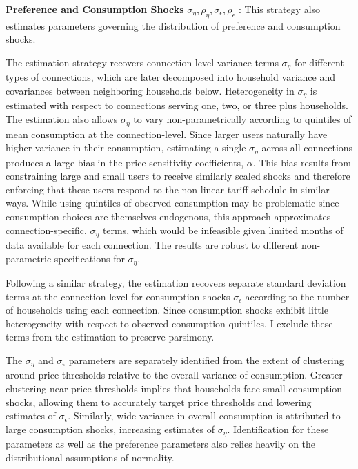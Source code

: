 \documentclass[12pt]{article}
\begin{document}
\textbf{Preference and Consumption Shocks} $\sigma_{\eta},\rho_{\eta},\sigma_{\epsilon},\rho_{\epsilon}$  :  This strategy also estimates parameters governing the distribution of preference and consumption shocks.  

The estimation strategy recovers connection-level variance terms $\sigma_{\eta}$ for different types of connections, which are later decomposed into household variance and covariances between neighboring households below.  Heterogeneity in $\sigma_{\eta}$ is estimated with respect to connections serving one, two, or three plus households.  The estimation also allows $\sigma_{\eta}$ to vary non-parametrically according to quintiles of mean consumption at the connection-level.  Since larger users naturally have higher variance in their consumption, estimating a single $\sigma_{\eta}$ across all connections produces a large bias in the price sensitivity coefficients, $\alpha$.  This bias results from constraining large and small users to receive similarly scaled shocks and therefore enforcing that these users respond to the non-linear tariff schedule in similar ways.  While using quintiles of observed consumption may be problematic since consumption choices are themselves endogenous, this approach approximates connection-specific, $\sigma_{\eta}$ terms, which would be infeasible given limited months of data available for each connection.  The results are robust to different non-parametric specifications for $\sigma_{\eta}$.  

Following a similar strategy, the estimation recovers separate standard deviation terms at the connection-level for consumption shocks $\sigma_{\epsilon}$ according to the number of households using each connection.  Since consumption shocks exhibit little heterogeneity with respect to observed consumption quintiles, I exclude these terms from the estimation to preserve parsimony.

The $\sigma_{\eta}$ and $\sigma_{\epsilon}$ parameters are separately identified from the extent of clustering around price thresholds relative to the overall variance of consumption.  Greater clustering near price thresholds implies that households face small consumption shocks, allowing them to accurately target price thresholds and lowering estimates of $\sigma_{\epsilon}$.  Similarly, wide variance in overall consumption is attributed to large consumption shocks, increasing estimates of $\sigma_{\eta}$.  Identification for these parameters as well as the preference parameters also relies heavily on the distributional assumptions of normality.
\end{document}
